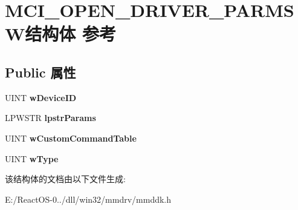 \hypertarget{struct_m_c_i___o_p_e_n___d_r_i_v_e_r___p_a_r_m_s_w}{}\section{M\+C\+I\+\_\+\+O\+P\+E\+N\+\_\+\+D\+R\+I\+V\+E\+R\+\_\+\+P\+A\+R\+M\+S\+W结构体 参考}
\label{struct_m_c_i___o_p_e_n___d_r_i_v_e_r___p_a_r_m_s_w}
\subsection*{Public 属性}
\begin{DoxyCompactItemize}
\item 
\mbox{\label{struct_m_c_i___o_p_e_n___d_r_i_v_e_r___p_a_r_m_s_w_a8fd7575583ec487fd6d84b5b3c03ef79}} 
U\+I\+NT {\bfseries w\+Device\+ID}
\item 
\mbox{\label{struct_m_c_i___o_p_e_n___d_r_i_v_e_r___p_a_r_m_s_w_a8c952aa82dfd289828ec3d5472e90ae7}} 
L\+P\+W\+S\+TR {\bfseries lpstr\+Params}
\item 
\mbox{\label{struct_m_c_i___o_p_e_n___d_r_i_v_e_r___p_a_r_m_s_w_a7c923c0e7d004ca13f760c8d458f6bda}} 
U\+I\+NT {\bfseries w\+Custom\+Command\+Table}
\item 
\mbox{\label{struct_m_c_i___o_p_e_n___d_r_i_v_e_r___p_a_r_m_s_w_aace0d4900d08bca1a16845a63559d6b5}} 
U\+I\+NT {\bfseries w\+Type}
\end{DoxyCompactItemize}


该结构体的文档由以下文件生成\+:\begin{DoxyCompactItemize}
\item 
E\+:/\+React\+O\+S-\/0../dll/win32/mmdrv/mmddk.\+h\end{DoxyCompactItemize}
